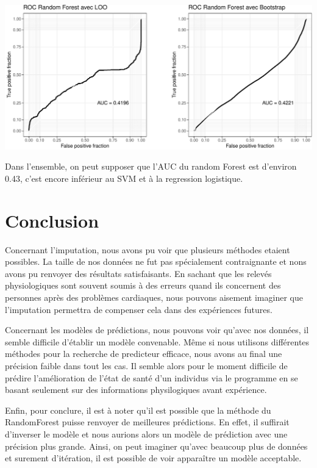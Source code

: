 \documentclass[]{article}
\begin{document}
\includegraphics{repport_projet_files/figure-latex/unnamed-chunk-59-1.pdf}

Dans l'ensemble, on peut supposer que l'AUC du random Forest est
d'environ 0.43, c'est encore inférieur au SVM et à la regression
logistique.

\hypertarget{conclusion}{%
\section{Conclusion}\label{conclusion}}

Concernant l'imputation, nous avons pu voir que plusieurs méthodes
etaient possibles. La taille de nos données ne fut pas spécialement
contraignante et nons avons pu renvoyer des résultats satisfaisants. En
sachant que les relevés physiologiques sont souvent soumis à des erreurs
quand ils concernent des personnes après des problèmes cardiaques, nous
pouvons aisement imaginer que l'imputation permettra de compenser cela
dans des expériences futures.

Concernant les modèles de prédictions, nous pouvons voir qu'avec nos
données, il semble difficile d'établir un modèle convenable. Même si
nous utilisons différentes méthodes pour la recherche de predicteur
efficace, nous avons au final une précision faible dans tout les cas. Il
semble alors pour le moment difficile de prédire l'amélioration de
l'état de santé d'un individus via le programme en se basant seulement
sur des informations physilogiques avant expérience.

Enfin, pour conclure, il est à noter qu'il est possible que la méthode
du RandomForest puisse renvoyer de meilleures prédictions. En effet, il
suffirait d'inverser le modèle et nous aurions alors un modèle de
prédiction avec une précision plus grande. Ainsi, on peut imaginer
qu'avec beaucoup plus de données et surement d'itération, il est
possible de voir apparaître un modèle acceptable.
\end{document}
